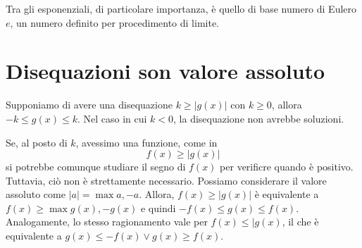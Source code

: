 \documentclass[a4paper]{article}
\begin{document}
%    
%
%
%    
%

Tra gli esponenziali, di particolare importanza, è quello di base numero di Eulero \(e\),
un numero definito per procedimento di limite.

\pagebreak

\section{Disequazioni son valore assoluto}

Supponiamo di avere una disequazione \(k \geq |g(x)|\)
con \(k \geq 0\), allora \(-k \leq g(x) \leq k\).
Nel caso in cui \(k <0\), la disequazione non avrebbe soluzioni.

Se, al posto di \(k\), avessimo una funzione, come in
\[ f(x) \geq |g(x)| \]
si potrebbe comunque studiare il segno di \(f(x)\)
per verificre quando è positivo.
Tuttavia, ciò non è strettamente necessario.
Possiamo considerare il valore assoluto come \(|a| = \max{a, -a}\).
Allora, \(f(x) \geq |g(x)|\) è equivalente a \(f(x) \geq \max {g(x), -g(x)} \)
e quindi \(-f(x) \leq g(x) \leq f(x)\).
Analogamente, lo stesso ragionamento vale per \(f(x) \leq |g(x)\),
il che è equivalente a \(g(x) \leq -f(x) \lor g(x) \geq f(x)\).

\end{document}
